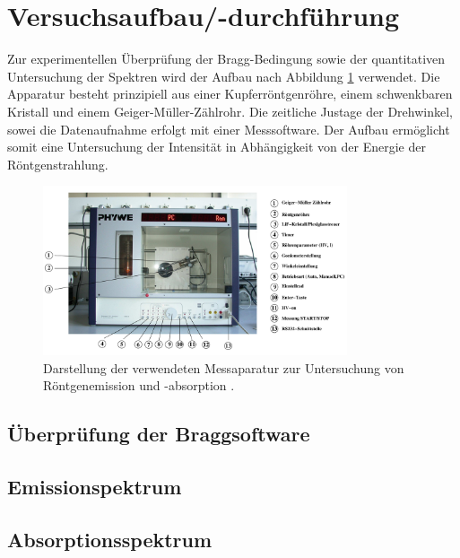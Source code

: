 \section{Versuchsaufbau/-durchführung}
Zur experimentellen Überprüfung der Bragg-Bedingung sowie der quantitativen Untersuchung der Spektren wird der Aufbau nach Abbildung
\ref{fig: aufbau} verwendet. Die Apparatur besteht prinzipiell aus einer Kupferröntgenröhre, einem schwenkbaren Kristall und einem
Geiger-Müller-Zählrohr. Die zeitliche Justage der Drehwinkel, sowei die Datenaufnahme erfolgt mit einer
Messsoftware. Der Aufbau ermöglicht somit eine Untersuchung der Intensität in Abhängigkeit von der Energie
der Röntgenstrahlung.
\begin{figure}
  \centering
  \includegraphics[width = 0.8\textwidth]{pics/aufbau.png}
  \caption{Darstellung der verwendeten Messaparatur zur Untersuchung von Röntgenemission und -absorption \cite{}.}
  \label{fig: aufbau}
\end{figure}
\subsection{Überprüfung der Braggsoftware}

\subsection{Emissionspektrum}

\subsection{Absorptionsspektrum}
